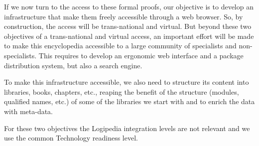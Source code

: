 If we now turn to the access to these formal proofs, our objective is
to develop an infrastructure that make them freely accessible through
a web browser. So, by construction, the access will be trans-national
and virtual. But beyond these two objectives of a trans-national and
virtual access, an important effort will be made to make this
encyclopedia accessible to a large community of specialists and
non-specialists.  This requires to develop an ergonomic web interface
and a package distribution system, but also a search engine.

To make this infrastructure accessible, we also need to structure its
content into libraries, books, chapters, etc., reaping the benefit of
the structure (modules, qualified names, etc.) of some of the
libraries we start with and to enrich the data with meta-data.

For these two objectives the Logipedia integration levels are not
relevant and we use the common Technology readiness level.

